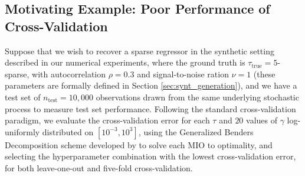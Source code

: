 \documentclass[mnsc,nonblindrev]{informs3} %
\newcommand{\ag}[1]{{\color{black}#1}}
\begin{document}




\subsection{Motivating Example: Poor Performance of Cross-Validation}\label{sec:intro_motivation}
Suppose that we wish to recover a sparse regressor in the synthetic setting described in our numerical experiments, where the ground truth is $\tau_{\text{true}}=5$-sparse, with autocorrelation $\rho=0.3$ and signal-to-noise ration $\nu=1$ (these parameters are formally defined in Section \ref{sec:synt_generation}), and we have a test set of $n_{\text{test}}=10,000$ observations drawn from the same underlying stochastic process to measure test set performance. Following the standard {\color{black}cross-validation} paradigm, we evaluate the {\color{black}cross-validation} error for each $\tau$ and $20$ values of $\gamma$ log-uniformly distributed on $[10^{-3}, 10^3]$, using the Generalized Benders Decomposition scheme developed by \cite{bertsimas2020sparse} to solve each MIO to optimality, and selecting the hyperparameter combination with the lowest {\color{black}cross-validation error, for both leave-one-out and five-fold cross-validation.} 
\end{document}
